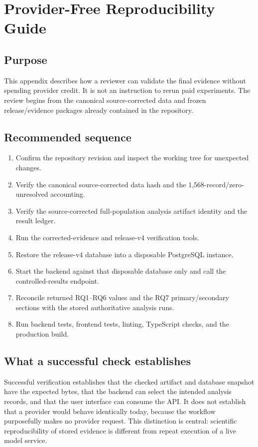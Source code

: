 \chapter{Provider-Free Reproducibility Guide}

\section{Purpose}

This appendix describes how a reviewer can validate the final evidence without spending provider credit. It is not an instruction to rerun paid experiments. The review begins from the canonical source-corrected data and frozen release/evidence packages already contained in the repository.

\section{Recommended sequence}

\begin{enumerate}[leftmargin=1.6em]
\item Confirm the repository revision and inspect the working tree for unexpected changes.
\item Verify the canonical source-corrected data hash and the 1,568-record/zero-unresolved accounting.
\item Verify the source-corrected full-population analysis artifact identity and the result ledger.
\item Run the corrected-evidence and release-v4 verification tools.
\item Restore the release-v4 database into a disposable PostgreSQL instance.
\item Start the backend against that disposable database only and call the controlled-results endpoint.
\item Reconcile returned RQ1--RQ6 values and the RQ7 primary/secondary sections with the stored authoritative analysis runs.
\item Run backend tests, frontend tests, linting, TypeScript checks, and the production build.
\end{enumerate}

\section{What a successful check establishes}

Successful verification establishes that the checked artifact and database snapshot have the expected bytes, that the backend can select the intended analysis records, and that the user interface can consume the API. It does not establish that a provider would behave identically today, because the workflow purposefully makes no provider request. This distinction is central: scientific reproducibility of stored evidence is different from repeat execution of a live model service.

